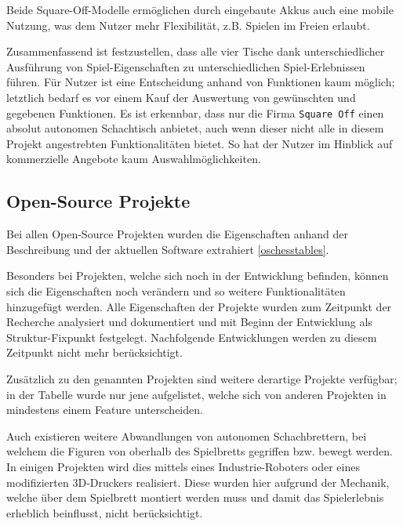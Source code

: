 Beide Square-Off-Modelle ermöglichen durch eingebaute Akkus auch eine
mobile Nutzung, was dem Nutzer mehr Flexibilität, z.B. Spielen im Freien
erlaubt.

Zusammenfassend ist festzustellen, dass alle vier Tische dank
unterschiedlicher Ausführung von Spiel-Eigenschaften zu
unterschiedlichen Spiel-Erlebnissen führen. Für Nutzer ist eine
Entscheidung anhand von Funktionen kaum möglich; letztlich bedarf es vor
einem Kauf der Auswertung von gewünschten und gegebenen Funktionen. Es
ist erkennbar, dass nur die Firma \passthrough{\lstinline!Square Off!}
einen absolut autonomen Schachtisch anbietet, auch wenn dieser nicht
alle in diesem Projekt angestrebten Funktionalitäten bietet. So hat der
Nutzer im Hinblick auf kommerzielle Angebote kaum Auswahlmöglichkeiten.

\hypertarget{open-source-projekte}{%
\subsection{Open-Source Projekte}\label{open-source-projekte}}

Bei allen Open-Source Projekten wurden die Eigenschaften anhand der
Beschreibung und der aktuellen Software extrahiert \ref{oschesstables}.

Besonders bei Projekten, welche sich noch in der Entwicklung befinden,
können sich die Eigenschaften noch verändern und so weitere
Funktionalitäten hinzugefügt werden. Alle Eigenschaften der Projekte
wurden zum Zeitpunkt der Recherche analysiert und dokumentiert und mit
Beginn der Entwicklung als Struktur-Fixpunkt festgelegt. Nachfolgende
Entwicklungen werden zu diesem Zeitpunkt nicht mehr berücksichtigt.

Zusätzlich zu den genannten Projekten sind weitere derartige Projekte
verfügbar; in der Tabelle wurde nur jene aufgelistet, welche sich von
anderen Projekten in mindestens einem Feature unterscheiden.

Auch existieren weitere Abwandlungen von autonomen Schachbrettern, bei
welchem die Figuren von oberhalb des Spielbretts gegriffen bzw. bewegt
werden. In einigen Projekten wird dies mittels eines Industrie-Roboters
\cite{actprojectrobot} oder eines modifizierten
3D-Druckers\cite{atcproject3dprinter} realisiert. Diese wurden hier
aufgrund der Mechanik, welche über dem Spielbrett montiert werden muss
und damit das Spielerlebnis erheblich beinflusst, nicht berücksichtigt.

